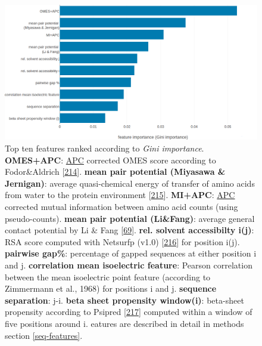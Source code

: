 \documentclass[11pt,a4paper,twoside]{book}
\theoremstyle{definition}
\theoremstyle{definition}
\theoremstyle{remark}
\begin{document}
\begin{figure}
\includegraphics[width=1\linewidth]{img/random_forest_contact_prior/feature_random_forest_optimalhyperparameters_topfeatures} \caption{Top ten features ranked according to
\emph{Gini importance}. \textbf{OMES+APC}:
\protect\hyperlink{abbrev}{APC} corrected OMES score according to
Fodor\&Aldrich {[}\protect\hyperlink{ref-Fodor2004a}{214}{]}.
\textbf{mean pair potential (Miyasawa \& Jernigan)}: average
quasi-chemical energy of transfer of amino acids from water to the
protein environment {[}\protect\hyperlink{ref-Miyazawa1999a}{215}{]}.
\textbf{MI+APC}: \protect\hyperlink{abbrev}{APC} corrected mutual
information between amino acid counts (using pseudo-counts).
\textbf{mean pair potential (Li\&Fang)}: average general contact
potential by Li \& Fang {[}\protect\hyperlink{ref-Li2011}{69}{]}.
\textbf{rel. solvent accessibilty i(j)}: RSA score computed with
Netsurfp (v1.0) {[}\protect\hyperlink{ref-Petersen2009a}{216}{]} for
position i(j). \textbf{pairwise gap\%}: percentage of gapped sequences
at either position i and j. \textbf{correlation mean isoelectric
feature}: Pearson correlation between the mean isoelectric point feature
(according to Zimmermann et al., 1968) for positions i and j.
\textbf{sequence separation}: \textbar{}j-i\textbar{}. \textbf{beta
sheet propensity window(i)}: beta-sheet propensity according to Psipred
{[}\protect\hyperlink{ref-Jones1999}{217}{]} computed within a window of
five positions around i. eatures are described in detail in methods
section \ref{seq-features}.}\label{fig:rf-feature-importance}
\end{figure}
\end{document}
